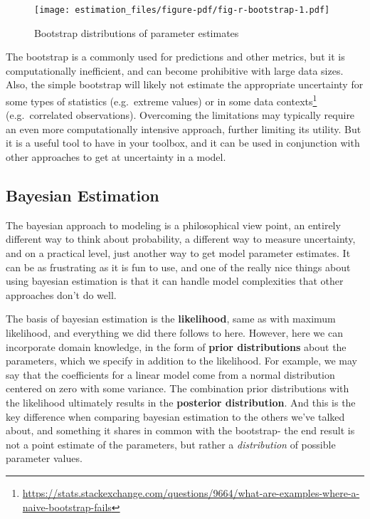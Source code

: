 \documentclass[
  letterpaper,
]{krantz}
\DeclareRobustCommand{\href}[2]{#2\footnote{\url{#1}}}
\begin{document}
\begin{figure}

{\centering \texttt{[image: estimation\_files/figure-pdf/fig-r-bootstrap-1.pdf]}

}

\caption{\label{fig-r-bootstrap}Bootstrap distributions of parameter
estimates}

\end{figure}

The bootstrap is a commonly used for predictions and other metrics, but
it is computationally inefficient, and can become prohibitive with large
data sizes. Also, the simple bootstrap will likely not estimate the
appropriate uncertainty for some types of statistics (e.g.~extreme
values) or
\href{https://stats.stackexchange.com/questions/9664/what-are-examples-where-a-naive-bootstrap-fails}{in
some data contexts} (e.g.~correlated observations). Overcoming the
limitations may typically require an even more computationally intensive
approach, further limiting its utility. But it is a useful tool to have
in your toolbox, and it can be used in conjunction with other approaches
to get at uncertainty in a model.

\subsection{Bayesian Estimation}\label{bayesian-estimation}

The bayesian approach to modeling is a philosophical view point, an
entirely different way to think about probability, a different way to
measure uncertainty, and on a practical level, just another way to get
model parameter estimates. It can be as frustrating as it is fun to use,
and one of the really nice things about using bayesian estimation is
that it can handle model complexities that other approaches don't do
well.

The basis of bayesian estimation is the \textbf{likelihood}, same as
with maximum likelihood, and everything we did there follows to here.
However, here we can incorporate domain knowledge, in the form of
\textbf{prior distributions} about the parameters, which we specify in
addition to the likelihood. For example, we may say that the
coefficients for a linear model come from a normal distribution centered
on zero with some variance. The combination prior distributions with the
likelihood ultimately results in the \textbf{posterior distribution}.
And this is the key difference when comparing bayesian estimation to the
others we've talked about, and something it shares in common with the
bootstrap- the end result is not a point estimate of the parameters, but
rather a \emph{distribution} of possible parameter values.
\end{document}
